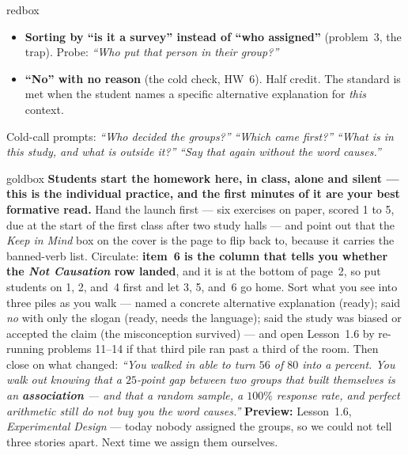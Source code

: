 \documentclass[10pt]{article}
\begin{document}
\begin{skillbox}{redbox}
\begin{itemize}[leftmargin=1.2em, nosep]
  \item \textbf{Sorting by ``is it a survey'' instead of ``who assigned''} (problem~3, the
        trap). Probe: \emph{``Who put that person in their group?''}
  \item \textbf{``No'' with no reason} (the cold check, HW~6). Half credit. The standard is met
        when the student names a specific alternative explanation for \emph{this} context.
\end{itemize}
Cold-call prompts: \emph{``Who decided the groups?''} \quad \emph{``Which came first?''} \quad
\emph{``What is in this study, and what is outside it?''} \quad \emph{``Say that again without
the word \emph{causes}.''}
\end{skillbox}

\boxguard
\begin{skillbox}{goldbox}
\textbf{Students start the homework here, in class, alone and silent --- this is the individual
practice, and the first minutes of it are your best formative read.} Hand the launch first ---
six exercises on paper, scored 1 to 5, due at the start of the first class after two study
halls --- and point out that the \emph{Keep in Mind} box on the cover is the page to flip back
to, because it carries the banned-verb list. Circulate: \textbf{item~6 is the column that tells
you whether the \emph{Not Causation} row landed}, and it is at the bottom of page~2, so put
students on 1, 2, and~4 first and let 3, 5, and~6 go home. Sort what you see into three piles
as you walk --- named a concrete alternative explanation (ready); said \emph{no} with only the
slogan (ready, needs the language); said the study was biased or accepted the claim (the
misconception survived) --- and open Lesson~1.6 by re-running problems 11--14 if that third
pile ran past a third of the room. Then close on what changed: \emph{``You walked in able to
turn $56$ of $80$ into a percent. You walk out knowing that a $25$-point gap between two groups
that built themselves is an \textbf{association} --- and that a random sample, a $100\%$
response rate, and perfect arithmetic still do not buy you the word \emph{causes}.''}
\textbf{Preview:} Lesson~1.6, \emph{Experimental Design} --- today nobody assigned the groups,
so we could not tell three stories apart. Next time we assign them ourselves.
\end{skillbox}
\end{document}
